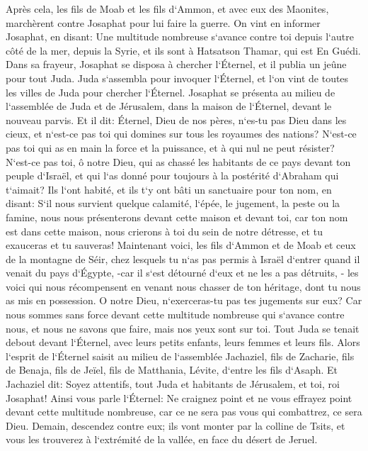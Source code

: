 \verse Après cela, les fils de Moab et les fils d`Ammon, et avec eux des Maonites, marchèrent contre Josaphat pour lui faire la guerre. 
\verse On vint en informer Josaphat, en disant: Une multitude nombreuse s`avance contre toi depuis l`autre côté de la mer, depuis la Syrie, et ils sont à Hatsatson Thamar, qui est En Guédi. 
\verse Dans sa frayeur, Josaphat se disposa à chercher l`Éternel, et il publia un jeûne pour tout Juda. 
\verse Juda s`assembla pour invoquer l`Éternel, et l`on vint de toutes les villes de Juda pour chercher l`Éternel. 
\verse Josaphat se présenta au milieu de l`assemblée de Juda et de Jérusalem, dans la maison de l`Éternel, devant le nouveau parvis. 
\verse Et il dit: Éternel, Dieu de nos pères, n`es-tu pas Dieu dans les cieux, et n`est-ce pas toi qui domines sur tous les royaumes des nations? N`est-ce pas toi qui as en main la force et la puissance, et à qui nul ne peut résister? 
\verse N`est-ce pas toi, ô notre Dieu, qui as chassé les habitants de ce pays devant ton peuple d`Israël, et qui l`as donné pour toujours à la postérité d`Abraham qui t`aimait? 
\verse Ils l`ont habité, et ils t`y ont bâti un sanctuaire pour ton nom, en disant: 
\verse S`il nous survient quelque calamité, l`épée, le jugement, la peste ou la famine, nous nous présenterons devant cette maison et devant toi, car ton nom est dans cette maison, nous crierons à toi du sein de notre détresse, et tu exauceras et tu sauveras! 
\verse Maintenant voici, les fils d`Ammon et de Moab et ceux de la montagne de Séir, chez lesquels tu n`as pas permis à Israël d`entrer quand il venait du pays d`Égypte, -car il s`est détourné d`eux et ne les a pas détruits, - 
\verse les voici qui nous récompensent en venant nous chasser de ton héritage, dont tu nous as mis en possession. 
\verse O notre Dieu, n`exerceras-tu pas tes jugements sur eux? Car nous sommes sans force devant cette multitude nombreuse qui s`avance contre nous, et nous ne savons que faire, mais nos yeux sont sur toi. 
\verse Tout Juda se tenait debout devant l`Éternel, avec leurs petits enfants, leurs femmes et leurs fils. 
\verse Alors l`esprit de l`Éternel saisit au milieu de l`assemblée Jachaziel, fils de Zacharie, fils de Benaja, fils de Jeïel, fils de Matthania, Lévite, d`entre les fils d`Asaph. 
\verse Et Jachaziel dit: Soyez attentifs, tout Juda et habitants de Jérusalem, et toi, roi Josaphat! Ainsi vous parle l`Éternel: Ne craignez point et ne vous effrayez point devant cette multitude nombreuse, car ce ne sera pas vous qui combattrez, ce sera Dieu. 
\verse Demain, descendez contre eux; ils vont monter par la colline de Tsits, et vous les trouverez à l`extrémité de la vallée, en face du désert de Jeruel. 

